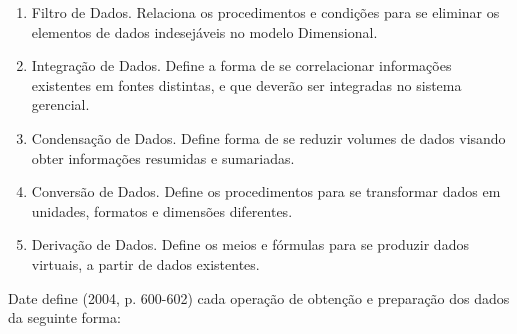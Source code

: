 \documentclass[a4paper]{article}
\newcommand\liststyleWWviiiNumxi{%
\renewcommand\theenumi{\alph{enumi}}
\renewcommand\theenumii{\alph{enumii}}
\renewcommand\theenumiii{\roman{enumiii}}
\renewcommand\theenumiv{\arabic{enumiv}}
\renewcommand\labelenumi{\theenumi)}
\renewcommand\labelenumii{\theenumii.}
\renewcommand\labelenumiii{\theenumiii.}
\renewcommand\labelenumiv{\theenumiv.}
}
\begin{document}
\liststyleWWviiiNumxi
\begin{enumerate}
\item {\sffamily
Filtro de Dados. Relaciona os procedimentos e condi\c{c}\~oes para se eliminar os elementos de dados indesej\'aveis no
modelo Dimensional.}
\item {\sffamily
Integra\c{c}\~ao de Dados. Define a forma de se correlacionar informa\c{c}\~oes existentes em fontes distintas, e que
dever\~ao ser integradas no sistema gerencial.}
\item {\sffamily
Condensa\c{c}\~ao de Dados. Define forma de se reduzir volumes de dados visando obter informa\c{c}\~oes resumidas e
sumariadas.}
\item {\sffamily
Convers\~ao de Dados. Define os procedimentos para se transformar dados em unidades, formatos e dimens\~oes diferentes.}
\item {\sffamily
Deriva\c{c}\~ao de Dados. Define os meios e f\'ormulas para se produzir dados virtuais, a partir de dados existentes.}
\end{enumerate}
{\sffamily
Date define (2004, p. 600-602) cada opera\c{c}\~ao de obten\c{c}\~ao e prepara\c{c}\~ao dos dados da seguinte forma:}
\end{document}
